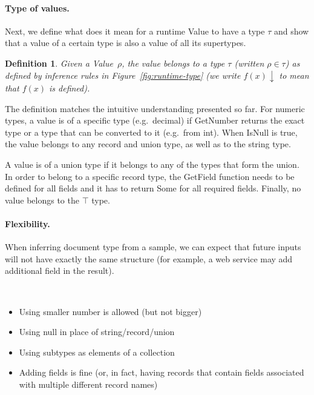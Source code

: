 \documentclass[10pt]{sigplanconf}
\newtheorem{definition}{Definition}
\newcommand{\ident}[1]{\textnormal{\sffamily #1}}
\begin{document}
\paragraph{Type of values.} Next, we define what does it mean for a runtime \ident{Value} to 
have a type $\tau$ and show that a value of a certain type is also a value of all its supertypes.

\begin{definition}
Given a \ident{Value}~$\rho$, the value belongs to a type $\tau$ (written
$\rho \in \tau$) as defined by inference rules in Figure~\ref{fig:runtime-type}
(we write $f(x)\downarrow$ to mean that $f(x)$ is defined).
\end{definition}

\noindent
The definition matches the intuitive understanding presented so far. For numeric types, a value is 
of a specific type (e.g.~\ident{decimal}) if \ident{GetNumber} returns the exact type or a type that
can be converted to it (e.g.~from \ident{int}). When \ident{IsNull} is true, the value belongs to 
any record and union type, as well as to the \ident{string} type.

A value is of a union type if it belongs to any of the types that form the union. In order to belong
to a specific record type, the \ident{GetField} function needs to be defined for all fields and it
has to return \ident{Some} for all required fields. Finally, no value belongs to the $\top$ type.

\paragraph{Flexibility.} When inferring document type from a sample, we can expect that future
inputs will not have exactly the same structure (for example, a web service may add additional 
field in the result). 


~
\begin{itemize}
\item Using smaller number is allowed (but not bigger)
\item Using null in place of string/record/union
\item Using subtypes as elements of a collection
\item Adding fields is fine (or, in fact, having records that contain fields 
  associated with multiple different record names)
\end{itemize}

~

~
\end{document}
